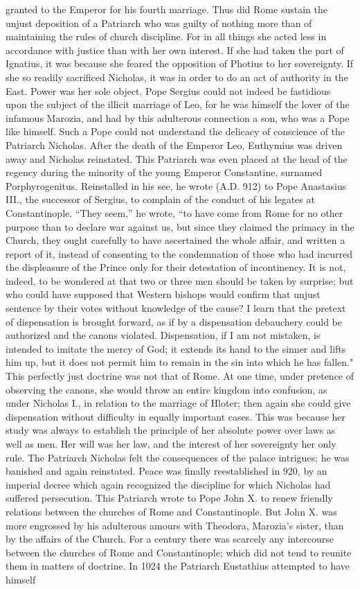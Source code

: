 granted to the Emperor for his fourth marriage. Thus did Rome sustain the unjust deposition of a Patriarch who was guilty of nothing more than of maintaining the rules of church discipline. For in all things she acted less in accordance with justice than with her own interest. If she had taken the part of Ignatius, it was because she feared the opposition of Photius to her sovereignty. If she so readily sacrificed Nicholas, it was in order to do an act of authority in the East. Power was her sole object. Pope Sergius could not indeed be fastidious upon the subject of the illicit marriage of Leo, for he was himself the lover of the infamous Marozia, and had by this adulterous connection a son, who was a Pope like himself. Such a Pope could not understand the delicacy of conscience of the Patriarch Nicholas. After the death of the Emperor Leo, Euthymius was driven away and Nicholas reinstated. This Patriarch was even placed at the head of the regency during the minority of the young Emperor Constantine, surnamed Porphyrogenitus. Reinstalled in his see, he wrote (A.D. 912) to Pope Anastasius III., the successor of Sergius, to complain of the conduct of his legates at Constantinople. “They seem,” he wrote, “to have come from Rome for no other purpose than to declare war against us, but since they claimed the primacy in the Church, they ought carefully to have ascertained the whole affair, and written a report of it, instead of consenting to the condemnation of those who had incurred the displeasure of the Prince only for their detestation of incontinency. It is not, indeed, to be wondered at that two or three men should be taken by surprise; but who could have supposed that Western bishops would confirm that unjust sentence by their votes without knowledge of the cause? I learn that the pretext of dispensation is brought forward, as if by a dispensation debauchery could be authorized and the canons violated. Dispensation, if I am not mistaken, is intended to imitate the mercy of God; it extends its hand to the sinner and lifts him up, but it does not permit him to remain in the sin into which he has fallen." This perfectly just doctrine was not that of Rome. At one time, under pretence of observing the canons, she would throw an entire kingdom into confusion, as under Nicholas I., in relation to the marriage of Hloter; then again she could give dispensation without difficulty in equally important cases. This was because her study was always to establish the principle of her absolute power over laws as well as men. Her will was her law, and the interest of her sovereignty her only rule. The Patriarch Nicholas felt the consequences of the palace intrigues; he was banished and again reinstated. Peace was finally reestablished in 920, by an imperial decree which again recognized the discipline for which Nicholas had suffered persecution. This Patriarch wrote to Pope John X. to renew friendly relations between the churches of Rome and Constantinople. But John X. was more engrossed by his adulterous amours with Theodora, Marozia's sister, than by the affairs of the Church. For a century there was scarcely any intercourse between the churches of Rome and Constantinople; which did not tend to reunite them in matters of doctrine. In 1024 the Patriarch Eustathius attempted to have himself 